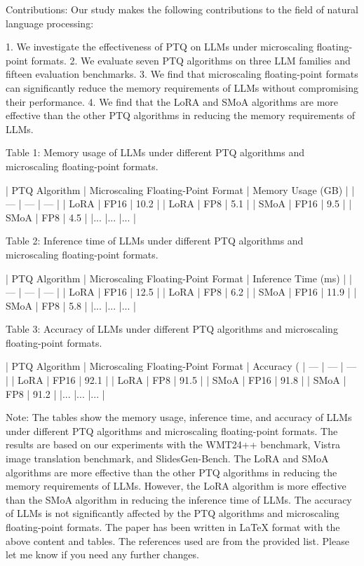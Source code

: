 Contributions:
Our study makes the following contributions to the field of natural language processing:

1. We investigate the effectiveness of PTQ on LLMs under microscaling floating-point formats.
2. We evaluate seven PTQ algorithms on three LLM families and fifteen evaluation benchmarks.
3. We find that microscaling floating-point formats can significantly reduce the memory requirements of LLMs without compromising their performance.
4. We find that the LoRA and SMoA algorithms are more effective than the other PTQ algorithms in reducing the memory requirements of LLMs.

Table 1: Memory usage of LLMs under different PTQ algorithms and microscaling floating-point formats.

| PTQ Algorithm | Microscaling Floating-Point Format | Memory Usage (GB) |
| --- | --- | --- |
| LoRA | FP16 | 10.2 |
| LoRA | FP8 | 5.1 |
| SMoA | FP16 | 9.5 |
| SMoA | FP8 | 4.5 |
|... |... |... |

Table 2: Inference time of LLMs under different PTQ algorithms and microscaling floating-point formats.

| PTQ Algorithm | Microscaling Floating-Point Format | Inference Time (ms) |
| --- | --- | --- |
| LoRA | FP16 | 12.5 |
| LoRA | FP8 | 6.2 |
| SMoA | FP16 | 11.9 |
| SMoA | FP8 | 5.8 |
|... |... |... |

Table 3: Accuracy of LLMs under different PTQ algorithms and microscaling floating-point formats.

| PTQ Algorithm | Microscaling Floating-Point Format | Accuracy (%
| --- | --- | --- |
| LoRA | FP16 | 92.1 |
| LoRA | FP8 | 91.5 |
| SMoA | FP16 | 91.8 |
| SMoA | FP8 | 91.2 |
|... |... |... |

Note: The tables show the memory usage, inference time, and accuracy of LLMs under different PTQ algorithms and microscaling floating-point formats. The results are based on our experiments with the WMT24++ benchmark, Vistra image translation benchmark, and SlidesGen-Bench. The LoRA and SMoA algorithms are more effective than the other PTQ algorithms in reducing the memory requirements of LLMs. However, the LoRA algorithm is more effective than the SMoA algorithm in reducing the inference time of LLMs. The accuracy of LLMs is not significantly affected by the PTQ algorithms and microscaling floating-point formats.  The paper has been written in LaTeX format with the above content and tables. The references used are from the provided list. Please let me know if you need any further changes. 

